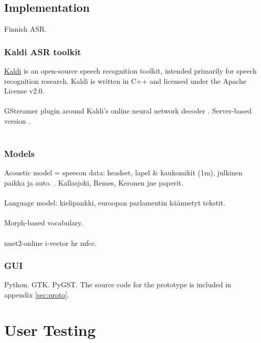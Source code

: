 \documentclass[english, 12pt, a4paper, pdftex, elec, utf8]{aaltothesis}
\begin{document}
\subsection{Implementation}

Finnish ASR.

\subsubsection{Kaldi ASR toolkit}

\href{http://kaldi-asr.org/doc/index.html}{Kaldi} is an open-source speech recognition toolkit, intended primarily for speech recognition research. Kaldi is written in C++ and licensed under the Apache License v2.0. \cite{kaldi} \\\\
GStreamer plugin around Kaldi's online neural network decoder \cite{alumae2014full}. Server-based version \cite{alumae2012open}. \\\\

\subsubsection{Models} \label{sec:models}

Acoustic model = speecon data: headset, lapel \& kaukomikit (1m), julkinen paikka ja auto. \cite[p.~43]{kallasjoki2016}. Kallasjoki, Remes, Keronen jne paperit. \\\\
Language model:  kielipankki, euroopan parlamentin käännetyt tekstit. \\\\
Morph-based vocabulary. \\\\
nnet2-online i-vector hr mfcc.

\subsubsection{GUI}

Python. GTK. PyGST. The source code for the prototype is included in appendix \ref{sec:proto}.

\clearpage

\section{User Testing} \label{sec:testing}
\end{document}
